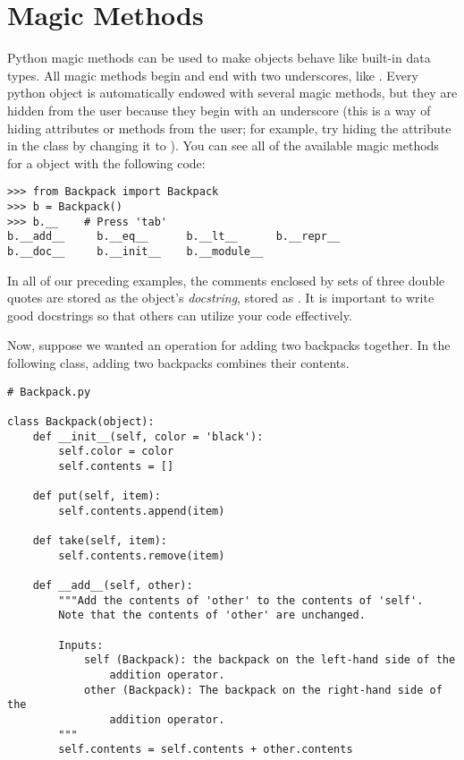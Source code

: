 \section*{Magic Methods}

Python magic methods can be used to make objects behave like built-in data types.
All magic methods begin and end with two underscores, like .
Every python object is automatically endowed with several magic methods, but they are hidden from the user because they begin with an underscore (this is a way of hiding attributes or methods from the user; for example, try hiding the  attribute in the  class by changing it to ).
You can see all of the available magic methods for a  object with the following code:

\begin{lstlisting}
>>> from Backpack import Backpack
>>> b = Backpack()
>>> b.__	# Press 'tab'
b.__add__     b.__eq__      b.__lt__      b.__repr__    
b.__doc__     b.__init__    b.__module__
\end{lstlisting}

In all of our preceding examples, the comments enclosed by sets of three double quotes are stored as the object's \emph{docstring}, stored as .
It is important to write good docstrings so that others can utilize your code effectively.

Now, suppose we wanted an operation for adding two backpacks together.
In the following class, adding two backpacks combines their contents.

\begin{lstlisting}
# Backpack.py

class Backpack(object):
    def __init__(self, color = 'black'):
        self.color = color
        self.contents = []

    def put(self, item):
        self.contents.append(item)

    def take(self, item):
        self.contents.remove(item)

    def __add__(self, other):
        """Add the contents of 'other' to the contents of 'self'.
        Note that the contents of 'other' are unchanged.
        
        Inputs:
            self (Backpack): the backpack on the left-hand side of the
                addition operator.
            other (Backpack): The backpack on the right-hand side of the
                addition operator.
        """
        self.contents = self.contents + other.contents
\end{lstlisting}

